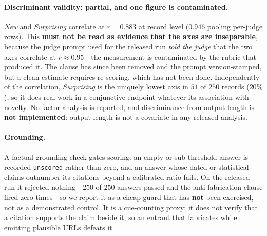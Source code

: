 \paragraph{Discriminant validity: partial, and one figure is contaminated.} \emph{New} and \emph{Surprising} correlate at $r = 0.883$ at record level ($0.946$ pooling per-judge rows). This \textbf{must not be read as evidence that the axes are inseparable}, because the judge prompt used for the released run \emph{told the judge} that the two axes correlate at $r \approx 0.95$---the measurement is contaminated by the rubric that produced it. The clause has since been removed and the prompt version-stamped, but a clean estimate requires re-scoring, which has not been done. Independently of the correlation, \emph{Surprising} is the uniquely lowest axis in $51$ of $250$ records ($20\%$), so it does real work in a conjunctive endpoint whatever its association with novelty. No factor analysis is reported, and discriminance from output length is \textbf{not implemented}: output length is not a covariate in any released analysis.

\paragraph{Grounding.} A factual-grounding check gates scoring: an empty or sub-threshold answer is recorded \texttt{unscored} rather than zero, and an answer whose dated or statistical claims outnumber its citations beyond a calibrated ratio fails. On the released run it rejected nothing---$250$ of $250$ answers passed and the anti-fabrication clause fired zero times---so we report it as a cheap guard that has \textbf{not} been exercised, not as a demonstrated control. It is a cue-counting proxy: it does not verify that a citation supports the claim beside it, so an entrant that fabricates while emitting plausible URLs defeats it.
